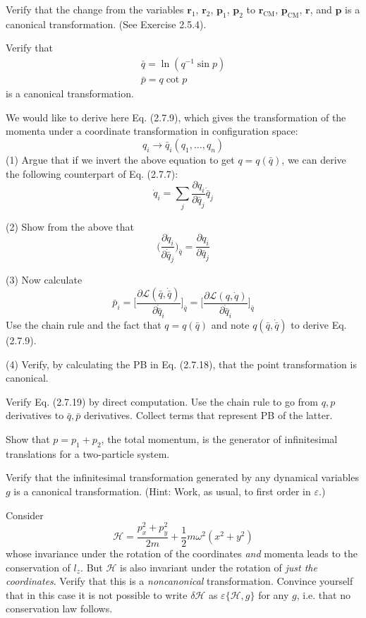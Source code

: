 \documentclass[../principles-of-quantum-mechanics.tex]{subfiles}
\begin{document}
\begin{questions}
		\question Verify that the change from the variables $\mathbf{r}_1$, $\mathbf{r}_2$, $\mathbf{p}_1$, $\mathbf{p}_2$ to $\mathbf{r}_{\text{CM}}$, $\mathbf{p}_{\text{CM}}$, $\mathbf{r}$, and $\mathbf{p}$ is a canonical transformation. (See Exercise 2.5.4).
		
		\question Verify that
		\begin{gather*}
			\bar{q} = \ln(q^{-1}\sin p) \\
			\bar{p} = q\cot p
		\end{gather*}
		is a canonical transformation.
		
		\question We would like to derive here Eq. (2.7.9), which gives the transformation of the momenta under a coordinate transformation in configuration space:
		\[
			q_i \to \bar{q}_i(q_1, \dots, q_n)
		\]
		(1) Argue that if we invert the above equation to get $q = q(\bar{q})$, we can derive the following counterpart of Eq. (2.7.7):
		\[
			\dot{q}_i = \sum_j\frac{\partial q_i}{\partial \bar{q}_j}\dot{\bar{q}}_j
		\]
		
		(2) Show from the above that
		\[
			\Big(\frac{\partial\dot{q}_i}{\partial\dot{\bar{q}}_j}\Big)_{\bar{q}} = \frac{\partial q_i}{\partial\bar{q}_j}
		\]
		
		(3) Now calculate
		\[
			\bar{p}_i = \Big[\frac{\partial\mathcal{L}(\bar{q}, \dot{\bar{q}})}{\partial\dot{\bar{q}}_i}\Big]_{\bar{q}} = \Big[\frac{\partial\mathcal{L}({q}, \dot{{q}})}{\partial\dot{\bar{q}}_i}\Big]_{\bar{q}}
		\]
		Use the chain rule and the fact that $q = q(\bar{q})$ and note $q(\bar{q}, \dot{\bar{q}})$ to derive Eq. (2.7.9).
		
		(4) Verify, by calculating the PB in Eq. (2.7.18), that the point transformation is canonical.
		
		\question Verify Eq. (2.7.19) by direct computation. Use the chain rule to go from $q, p$ derivatives to $\bar{q}, \bar{p}$ derivatives. Collect terms that represent PB of the latter.
		
		\question Show that $p = p_1 + p_2$, the total momentum, is the generator of infinitesimal translations for a two-particle system.
		
		\question Verify that the infinitesimal transformation generated by any dynamical variables $g$ is a canonical transformation. (Hint: Work, as usual, to first order in $\varepsilon$.)
		
		\question Consider
		\[
			\mathcal{H} = \frac{p_x^2 + p_y^2}{2m} + \frac{1}{2}m\omega^2(x^2+y^2)
		\]
		whose invariance under the rotation of the coordinates \textit{and} momenta leads to the conservation of $l_z$. But $\mathcal{H}$ is also invariant under the rotation of \textit{just the coordinates}. Verify that this is a \textit{noncanonical} transformation. Convince yourself that in this case it is not possible to write $\delta\mathcal{H}$ as $\varepsilon\{\mathcal{H}, g\}$ for any $g$, i.e. that no conservation law follows.
		

\end{questions}
\end{document}
